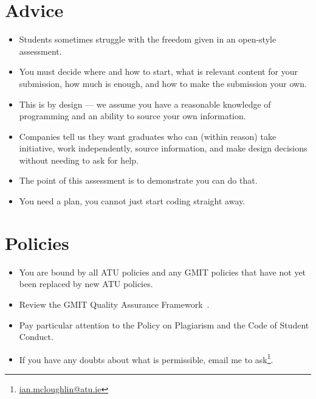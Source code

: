 \documentclass[a4paper]{tufte-handout}
\begin{document}
\section{Advice}

\begin{itemize}
  \item Students sometimes struggle with the freedom given in an open-style assessment.
  \item You must decide where and how to start, what is relevant content for your submission, how much is enough, and how to make the submission your own.
  \item This is by design --- we assume you have a reasonable knowledge of programming and an ability to source your own information.
  \item Companies tell us they want graduates who can (within reason) take initiative, work independently, source information, and make design decisions without needing to ask for help.
  \item The point of this assessment is to demonstrate you can do that.
  \item You need a plan, you cannot just start coding straight away.
\end{itemize}


\section{Policies}

\begin{itemize}
  \item You are bound by all ATU policies and any GMIT policies that have not yet been replaced by new ATU policies.
  \item Review the GMIT Quality Assurance Framework~\cite{gmitqaf}.
  \item Pay particular attention to the Policy on Plagiarism and the Code of Student Conduct.
  \item If you have any doubts about what is permissible, email me to ask\footnote{\url{ian.mcloughlin@atu.ie}}.
\end{itemize}



\end{document}
